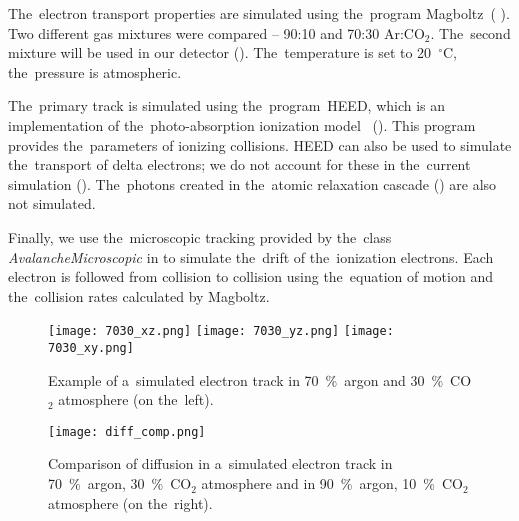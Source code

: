 		The~electron transport properties are simulated using the~program Magboltz~( ). Two different gas mixtures were compared -- 90:10 and 70:30 Ar:CO$_2$. The~second mixture will be used in our detector (). The~temperature is set to 20~$^\circ$C, the~pressure is atmospheric.
		
		The~primary track is simulated using the~program~\ac{HEED}, which is an implementation of the~photo-absorption ionization model~\cite{HEED} (). This program provides the~parameters of ionizing collisions. \ac{HEED} can also be used to simulate the~transport of delta electrons; we do not account for these in the~current simulation (). The~photons created in the~atomic relaxation cascade () are also not simulated.
		
		Finally, we use the~microscopic tracking provided by the~class \textit{AvalancheMicroscopic} in \garfieldpp to simulate the~drift of the~ionization electrons. Each electron is followed from collision to collision using the~equation of motion and the~collision rates calculated by Magboltz.
		
		
		\begin{figure}[H]
			\centering
			\texttt{[image: 7030\_xz.png]}
			\texttt{[image: 7030\_yz.png]}
			\texttt{[image: 7030\_xy.png]}
			\caption{Example of a~simulated electron track in 70~\%~argon and 30~\%~CO$_2$ atmosphere (on the~left). }
			\label{fig:7030sim}
		\end{figure}
		
		\begin{figure}[H]
			\centering
			\texttt{[image: diff\_comp.png]}
			\caption{Comparison of diffusion in a~simulated electron track in 70~\%~argon, 30~\%~CO$_2$ atmosphere and in 90~\%~argon, 10~\%~CO$_2$ atmosphere (on the~right). }
			\label{fig:diffcomp}
		\end{figure}
		
